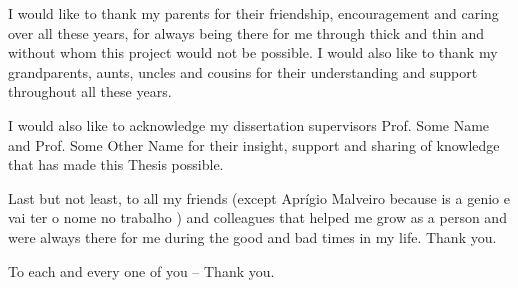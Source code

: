
I would like to thank my parents for their friendship, encouragement and caring over all these years, for always being there for me through thick and thin and without whom this project would not be possible. I would also like to thank my grandparents, aunts, uncles and cousins for their understanding and support throughout all these years.

I would also like to acknowledge my dissertation supervisors Prof. Some Name and Prof. Some Other Name for their insight, support and sharing of knowledge that has made this Thesis possible.

Last but not least, to all my friends (except Aprígio Malveiro because is a genio e vai ter o nome no trabalho
) and colleagues that helped me grow as a person and were always there for me during the good and bad times in my life. Thank you.

To each and every one of you -- Thank you.